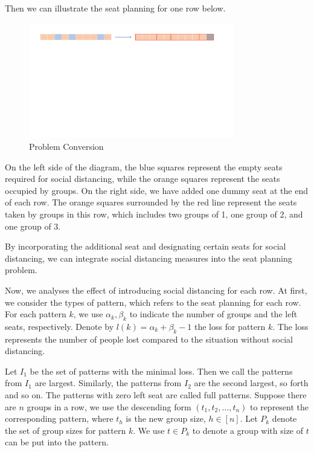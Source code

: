 Then we can illustrate the seat planning for one row below. 

\begin{figure}[ht]
    \centering
    \includegraphics[width = 0.8\textwidth]{./Figures/dummy_seat.pdf}
    \caption{Problem Conversion}
\end{figure}


On the left side of the diagram, the blue squares represent the empty seats required for social distancing, while the orange squares represent the seats occupied by groups. On the right side, we have added one dummy seat at the end of each row. The orange squares surrounded by the red line represent the seats taken by groups in this row, which includes two groups of 1, one group of 2, and one group of 3.

By incorporating the additional seat and designating certain seats for social distancing, we can integrate social distancing measures into the seat planning problem.


Now, we analyses the effect of introducing social distancing for each row. At first, we consider the types of pattern, which refers to the seat planning for each row. For each pattern $k$, we use $\alpha_k, \beta_k$ to indicate the number of groups and the left seats, respectively. Denote by $l(k) = \alpha_k + \beta_k -1$ the loss for pattern $k$. The loss represents the number of people lost compared to the situation without social distancing.

Let $I_1$ be the set of patterns with the minimal loss. Then we call the patterns from $I_1$ are largest. Similarly, the patterns from $I_2$ are the second largest, so forth and so on. The patterns with zero left seat are called full patterns. Suppose there are $n$ groups in a row, we use the descending form $(t_1, t_2, \ldots, t_n)$ to represent the corresponding pattern, where $t_h$ is the new group size, $h \in [n]$. Let $P_{k}$ denote the set of group sizes for pattern $k$. We use $t \in P_{k}$ to denote a group with size of $t$ can be put into the pattern. 


